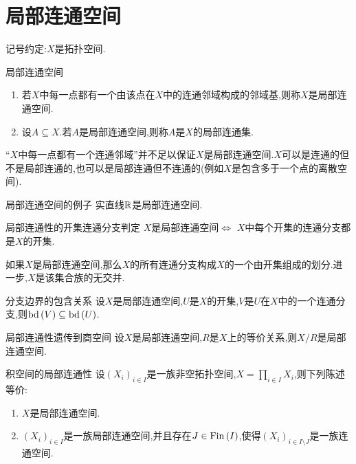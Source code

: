\section{局部连通空间}

记号约定:$X$是拓扑空间.

\begin{definition}{局部连通空间}{}
	\begin{enumerate}
		\item 若$X$中每一点都有一个由该点在$X$中的连通邻域构成的邻域基,则称$X$是局部连通空间.
		\item 设$A\subseteq X$.若$A$是局部连通空间,则称$A$是$X$的局部连通集.
	\end{enumerate}
\end{definition}

\begin{remark}{}{}
	``$X$中每一点都有一个连通邻域''并不足以保证$X$是局部连通空间.$X$可以是连通的但不是局部连通的,也可以是局部连通但不连通的(例如$X$是包含多于一个点的离散空间).
\end{remark}

\begin{example}{局部连通空间的例子}{}
	实直线$\mathbb{R}$是局部连通空间.
\end{example}

\begin{proposition}{局部连通性的开集连通分支判定}{}
	$X$是局部连通空间$\iff$ $X$中每个开集的连通分支都是$X$的开集.
\end{proposition}

\begin{remark}{}{}
	如果$X$是局部连通空间,那么$X$的所有连通分支构成$X$的一个由开集组成的划分.进一步,$X$是该集合族的无交并.
\end{remark}

\begin{corollary}{分支边界的包含关系}{}
	设$X$是局部连通空间,$U$是$X$的开集,$V$是$U$在$X$中的一个连通分支,则$\operatorname{bd}\left(V\right)\subseteq\operatorname{bd}\left(U\right)$.
\end{corollary}

\begin{proposition}{局部连通性遗传到商空间}{}
	设$X$是局部连通空间,$R$是$X$上的等价关系,则$X/R$是局部连通空间.
\end{proposition}

\begin{proposition}{积空间的局部连通性}{}
	设$\left(X_{i}\right)_{i\in I}$是一族非空拓扑空间,$X=\prod\limits_{i\in I}X_{i}$,则下列陈述等价:
	\begin{enumerate}
		\item $X$是局部连通空间.
		\item $\left(X_{i}\right)_{i\in I}$是一族局部连通空间,并且存在$J\in\operatorname{Fin}\left(I\right)$,使得$\left(X_{i}\right)_{i\in I\setminus J}$是一族连通空间.
	\end{enumerate}
\end{proposition}
